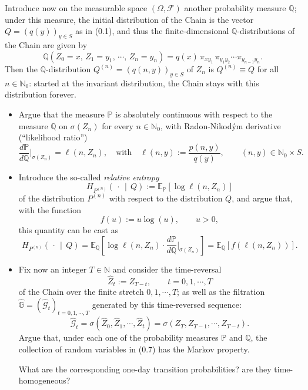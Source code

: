 Introduce now on the measurable space $(\Omega, \mathcal{F})$ another probability measure $\mathbb{Q}$; under this measure, the initial distribution of the Chain is the vector $Q = \left(q(y)\right)_{y \in S}$ as in (0.1), and thus the finite-dimensional $\mathbb{Q}$-distributions of the Chain are given by
\begin{equation}
    \mathbb{Q}\!\left(Z_0 = x,\, Z_1 = y_1,\, \cdots,\, Z_n = y_n\right) = q(x)\, \pi_{xy_1}\, \pi_{y_1 y_2} \cdots \pi_{y_{n-1} y_n}.
\end{equation}
Then the $\mathbb{Q}$-distribution $Q^{(n)} = \left(q(n,y)\right)_{y \in S}$ of $Z_n$ is $Q^{(n)} \equiv Q$ for all $n \in \mathbb{N}_0$: started at the invariant distribution, the Chain stays with this distribution forever.

\begin{itemize}
    \item[(i)] Argue that the measure $\mathbb{P}$ is absolutely continuous with respect to the measure $\mathbb{Q}$ on $\sigma(Z_n)$ for every $n \in \mathbb{N}_0$, with Radon-Nikod\'ym derivative (``likelihood ratio'')
    \begin{equation}
        \frac{d\mathbb{P}}{d\mathbb{Q}}\bigg|_{\sigma(Z_n)} = \ell\!\left(n, Z_n\right), \quad \text{with} \quad \ell(n,y) := \frac{p(n,y)}{q(y)}, \qquad (n,y) \in \mathbb{N}_0 \times S.
    \end{equation}

    \item[(ii)] Introduce the so-called \textit{relative entropy}
    \[
        H_{P^{(n)}}\!\left(\,\cdot\, \middle|\, Q\right) := \mathbb{E}_{\mathbb{P}}\!\left[\log \ell(n, Z_n)\right]
    \]
    of the distribution $P^{(n)}$ with respect to the distribution $Q$, and argue that, with the function
    \[
        f(u) := u \log(u), \qquad u > 0,
    \]
    this quantity can be cast as
    \begin{equation}
        H_{P^{(n)}}\!\left(\,\cdot\, \middle|\, Q\right) = \mathbb{E}_{\mathbb{Q}}\!\left[\log \ell(n, Z_n) \cdot \frac{d\mathbb{P}}{d\mathbb{Q}}\bigg|_{\sigma(Z_n)}\right] = \mathbb{E}_{\mathbb{Q}}\!\left[f\!\left(\ell(n, Z_n)\right)\right].
    \end{equation}

    \item[(iii)] Fix now an integer $T \in \mathbb{N}$ and consider the time-reversal
    \begin{equation}
        \widehat{Z}_t := Z_{T-t}, \qquad t = 0, 1, \cdots, T
    \end{equation}
    of the Chain over the finite stretch $0, 1, \cdots, T$; as well as the filtration $\widehat{\mathbb{G}} = \left(\widehat{\mathcal{G}}_t\right)_{t=0,1,\cdots,T}$ generated by this time-reversed sequence:
    \[
        \widehat{\mathcal{G}}_t = \sigma\!\left(\widehat{Z}_0, \widehat{Z}_1, \cdots, \widehat{Z}_t\right) = \sigma\!\left(Z_T, Z_{T-1}, \cdots, Z_{T-t}\right).
    \]
    Argue that, under each one of the probability measures $\mathbb{P}$ and $\mathbb{Q}$, the collection of random variables in (0.7) has the Markov property.

    What are the corresponding one-day transition probabilities? are they time-homogeneous?
\end{itemize}


